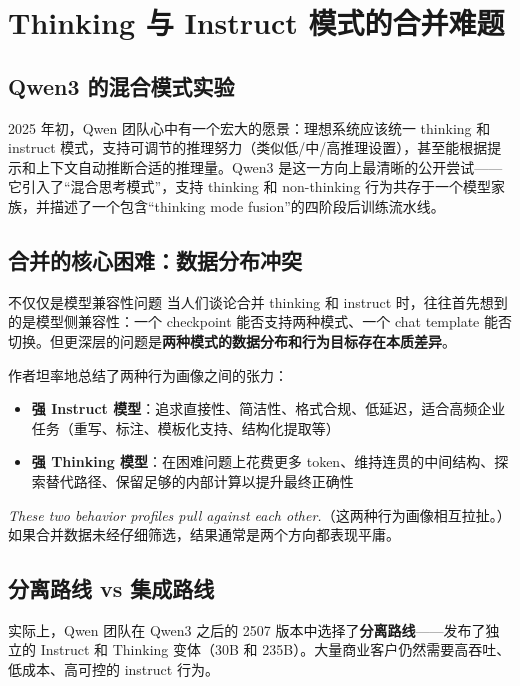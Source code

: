 \section{Thinking 与 Instruct 模式的合并难题}

\subsection{Qwen3 的混合模式实验}

2025 年初，Qwen 团队心中有一个宏大的愿景：理想系统应该统一 thinking 和 instruct 模式，支持可调节的推理努力（类似低/中/高推理设置），甚至能根据提示和上下文自动推断合适的推理量。Qwen3 是这一方向上最清晰的公开尝试——它引入了``混合思考模式''，支持 thinking 和 non-thinking 行为共存于一个模型家族，并描述了一个包含``thinking mode fusion''的四阶段后训练流水线。

\subsection{合并的核心困难：数据分布冲突}

\begin{warningbox}{不仅仅是模型兼容性问题}
当人们谈论合并 thinking 和 instruct 时，往往首先想到的是模型侧兼容性：一个 checkpoint 能否支持两种模式、一个 chat template 能否切换。但更深层的问题是\textbf{两种模式的数据分布和行为目标存在本质差异}。
\end{warningbox}

作者坦率地总结了两种行为画像之间的张力：

\begin{itemize}
    \item \textbf{强 Instruct 模型}：追求直接性、简洁性、格式合规、低延迟，适合高频企业任务（重写、标注、模板化支持、结构化提取等）
    \item \textbf{强 Thinking 模型}：在困难问题上花费更多 token、维持连贯的中间结构、探索替代路径、保留足够的内部计算以提升最终正确性
\end{itemize}

\textit{These two behavior profiles pull against each other.}（这两种行为画像相互拉扯。）如果合并数据未经仔细筛选，结果通常是两个方向都表现平庸。

\subsection{分离路线 vs 集成路线}

实际上，Qwen 团队在 Qwen3 之后的 2507 版本中选择了\textbf{分离路线}——发布了独立的 Instruct 和 Thinking 变体（30B 和 235B）。大量商业客户仍然需要高吞吐、低成本、高可控的 instruct 行为。

